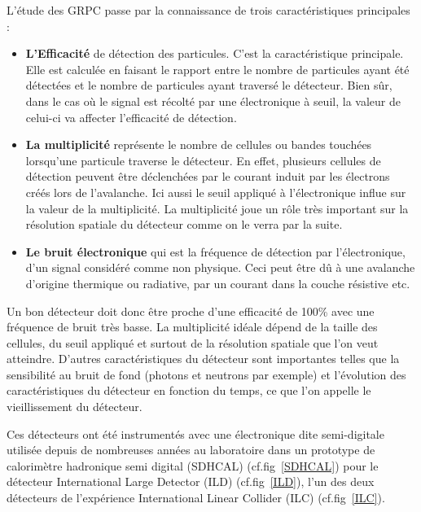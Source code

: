 L'étude des GRPC passe par la connaissance de trois caractéristiques principales :
\begin{itemize}[label=$\bullet$]
	\item \textbf{L'Efficacité} de détection des particules. C'est la caractéristique principale. Elle est calculée en faisant le rapport entre le nombre de particules ayant été détectées et le nombre de particules ayant traversé le détecteur. Bien sûr, dans le cas où le signal est récolté par une électronique à seuil, la valeur de celui-ci va affecter l'efficacité de détection.
	\item \textbf{La multiplicité} représente le nombre de cellules ou bandes touchées lorsqu'une particule traverse le détecteur. En effet, plusieurs cellules de détection peuvent être déclenchées par le courant induit par les électrons créés lors de l'avalanche. Ici aussi le seuil appliqué à l'électronique influe sur la valeur de la multiplicité. La multiplicité joue un rôle très important sur la résolution spatiale du détecteur comme on le verra par la suite.
	\item \textbf{Le bruit électronique} qui est la fréquence de détection par l'électronique, d'un signal considéré comme non physique. Ceci peut être dû à une avalanche d'origine thermique ou radiative, par un courant dans la couche résistive etc. 
\end{itemize}

Un bon détecteur doit donc être proche d'une efficacité de 100\% avec une fréquence de bruit très basse. La multiplicité idéale dépend de la taille des cellules, du seuil appliqué et surtout de la résolution spatiale que l'on veut atteindre. D'autres caractéristiques du détecteur sont importantes telles que la sensibilité au bruit de fond (photons et neutrons par exemple) et l'évolution des caractéristiques du détecteur en fonction du temps, ce que l'on appelle le vieillissement du détecteur.

Ces détecteurs ont été instrumentés avec une électronique dite semi-digitale utilisée depuis de nombreuses années au laboratoire dans un prototype de calorimètre hadronique semi digital (SDHCAL) (cf.fig~\ref{SDHCAL}) \cite{Buridon:2016ill} pour le détecteur International Large Detector (ILD) (cf.fig~\ref{ILD}), l'un des deux détecteurs de l'expérience International Linear Collider (ILC) (cf.fig~\ref{ILC}).


